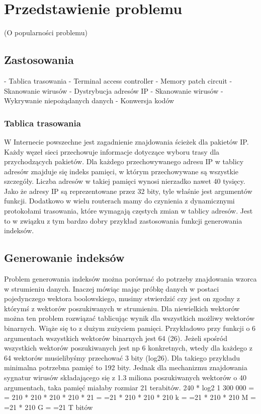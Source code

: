 \chapter{Przedstawienie problemu}
(O popularności problemu)

\section{Zastosowania}
- Tablica trasowania
- Terminal access controller
- Memory patch circuit
- Skanowanie wirusów
- Dystrybucja adresów IP
- Skanowanie wirusów
- Wykrywanie niepożądanych danych
- Konwersja kodów

\subsection{Tablica trasowania}
W Internecie powszechne jest zagadnienie znajdowania ścieżek dla pakietów IP. Każdy węzeł sieci przechowuje informacje dotyczące wyboru trasy dla przychodzących pakietów. Dla każdego przechowywanego adresu IP w tablicy adresów znajduje się indeks pamięci, w którym przechowywane są wszystkie szczegóły. Liczba adresów w takiej pamięci wynosi nierzadko nawet 40 tysięcy. Jako że adresy IP są reprezentowane przez 32 bity, tyle właśnie jest argumentów funkcji. Dodatkowo w wielu routerach mamy do czynienia z dynamicznymi protokołami trasowania, które wymagają częstych zmian w tablicy adresów. Jest to w związku z tym bardzo dobry przykład zastosowania funkcji generowania indeksów.

\section{Generowanie indeksów}

Problem generowania indeksów można porównać do potrzeby znajdowania wzorca w strumieniu danych. Inaczej mówiąc mając próbkę danych w postaci pojedynczego wektora boolowskiego, musimy stwierdzić czy jest on zgodny z którymś z wektorów poszukiwanych w strumieniu. Dla niewielkich wektorów można ten problem rozwiązać tablicując wynik dla wszystkich możliwy wektorów binarnych. Wiąże się to z dużym zużyciem pamięci. Przykładowo przy funkcji o 6 argumentach wszystkich wektorów binarnych jest 64 (26). Jeżeli spośród wszystkich wektorów poszukiwanych jest np 6 konkretnych, wtedy dla każdego z 64 wektorów musielibyśmy przechować 3 bity (log26). Dla takiego przykładu minimalna potrzebna pamięć to 192 bity. Jednak dla mechanizmu znajdowania sygnatur wirusów składającego się z 1.3 miliona poszukiwanych wektorów o 40 argumentach, taka pamięć miałaby rozmiar 21 terabitów.
240 * log2 1 300 000 =
= 210 * 210 * 210 * 210 * 21 =
=21 * 210 * 210 * 210 k =
=21 * 210 * 210 M =
=21 * 210 G =
=21 T bitów


